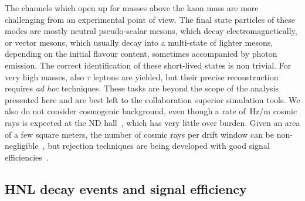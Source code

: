 The channels which open up for masses above the kaon mass are more challenging from an experimental point of view.
The final state particles of these modes are mostly neutral pseudo-scalar mesons, which decay electromagnetically, %
or vector mesons, which usually decay into a multi-state of lighter mesons, depending on the initial flavour content,
sometimes accompanied by photon emission.
The correct identification of these short-lived states is non trivial.
For very high masses, also $\tau$ leptons are yielded, but their precise reconstruction requires \emph{ad hoc} techniques.
These tasks are beyond the scope of the analysis presented here and are best left to the collaboration superior simulation tools.
We also do not consider cosmogenic background, even though a rate of \,Hz/m cosmic rays %
is expected at the ND hall~\cite{Sinclair:DUNEdoc}, which has very little over burden.
Given an area of a few square meters, the number of cosmic rays per drift window can be non-negligible~\cite{Abi:2018dnh}, %
but rejection techniques are being developed with good signal efficiencies~\cite{Adams:2018lzd}.


%
\subsection{HNL decay events and signal efficiency}
\label{sec:numevt}

